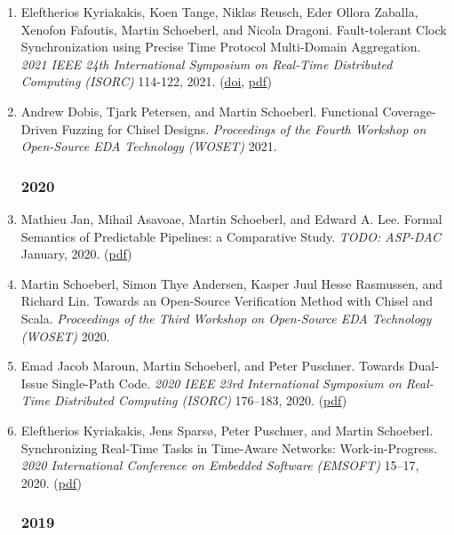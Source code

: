 \begin{enumerate}
\item Eleftherios Kyriakakis, Koen Tange, Niklas Reusch, Eder Ollora Zaballa, Xenofon Fafoutis, Martin Schoeberl, and Nicola Dragoni.
 Fault-tolerant Clock Synchronization using Precise Time Protocol Multi-Domain Aggregation.
 \emph{2021 IEEE 24th International Symposium on Real-Time Distributed Computing (ISORC)} 114-122, 2021.
(\href{http://dx.doi.org/10.1109/ISORC52013.2021.00025}{doi}, \href{https://www.jopdesign.com/doc/Securing_the_Precise_Time_Protocol.pdf}{pdf})

\item Andrew Dobis, Tjark Petersen, and Martin Schoeberl.
 Functional Coverage-Driven Fuzzing for Chisel Designs.
 \emph{Proceedings of the Fourth Workshop on Open-Source EDA Technology (WOSET)} 2021.



\subsubsection*{2020}

\item Mathieu Jan, Mihail Asavoae, Martin Schoeberl, and Edward A. Lee.
 Formal Semantics of Predictable Pipelines: a Comparative Study.
 \emph{TODO: ASP-DAC} January, 2020.
(\href{https://www.jopdesign.com/doc/verifypat.pdf}{pdf})

\item Martin Schoeberl, Simon Thye Andersen, Kasper Juul Hesse Rasmussen, and Richard Lin.
 Towards an Open-Source Verification Method with Chisel and Scala.
 \emph{Proceedings of the Third Workshop on Open-Source EDA Technology (WOSET)} 2020.


\item Emad Jacob Maroun, Martin Schoeberl, and Peter Puschner.
 Towards Dual-Issue Single-Path Code.
 \emph{2020 IEEE 23rd International Symposium on Real-Time Distributed Computing (ISORC)} 176--183, 2020.
(\href{https://www.jopdesign.com/doc/spvliw.pdf}{pdf})

\item Eleftherios Kyriakakis, Jens Spars{\o}, Peter Puschner, and Martin Schoeberl.
 Synchronizing Real-Time Tasks in Time-Aware Networks: Work-in-Progress.
 \emph{2020 International Conference on Embedded Software (EMSOFT)} 15--17, 2020.
(\href{https://www.jopdesign.com/doc/ttetask-wip.pdf}{pdf})


\subsubsection*{2019}


\end{enumerate}
